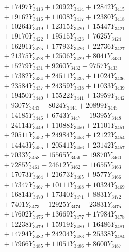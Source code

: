 \documentclass[a4paper,10pt]{article}
\begin{document}
{\begin{align}
&\;  + 17497 Y_{3413} + 12092 Y_{3414} + 12842 Y_{3415} \\[0.3ex]
&\;  + 19162 Y_{3416} + 11008 Y_{3417} + 12380 Y_{3418} \\[0.5ex]\allowbreak
&\;  + 10264 Y_{3419} + 12315 Y_{3420} + 15447 Y_{3421} \\[0.3ex]
&\;  + 19170 Y_{3422} + 19515 Y_{3423} + 7625 Y_{3424} \\[0.3ex]
&\;  + 16291 Y_{3425} + 17793 Y_{3426} + 22736 Y_{3427} \\[0.3ex]
&\;  + 21375 Y_{3428} + 12506 Y_{3429} + 8041 Y_{3430} \\[0.3ex]
&\;  + 15279 Y_{3431} + 9260 Y_{3432} + 9757 Y_{3433} \\[0.3ex]
&\;  + 17382 Y_{3434} + 24511 Y_{3435} + 11024 Y_{3436} \\[0.3ex]
&\;  + 23584 Y_{3437} + 24359 Y_{3438} + 11033 Y_{3439} \\[0.3ex]
&\;  + 19450 Y_{3440} + 15522 Y_{3441} + 13959 Y_{3442} \\[0.3ex]
&\;  + 9307 Y_{3443} + 8024 Y_{3444} + 20899 Y_{3445} \\[0.3ex]
&\;  + 14185 Y_{3446} + 6743 Y_{3447} + 19395 Y_{3448} \\[0.5ex]\allowbreak
&\;  + 24114 Y_{3449} + 11088 Y_{3450} + 21101 Y_{3451} \\[0.3ex]
&\;  + 20511 Y_{3452} + 24984 Y_{3453} + 12122 Y_{3454} \\[0.3ex]
&\;  + 14443 Y_{3455} + 20541 Y_{3456} + 23142 Y_{3457} \\[0.3ex]
&\;  + 7033 Y_{3458} + 15565 Y_{3459} + 19870 Y_{3460} \\[0.3ex]
&\;  + 7285 Y_{3461} + 24612 Y_{3462} + 11655 Y_{3463} \\[0.3ex]
&\;  + 17073 Y_{3464} + 21673 Y_{3465} + 9577 Y_{3466} \\[0.3ex]
&\;  + 17347 Y_{3467} + 10111 Y_{3468} + 10324 Y_{3469} \\[0.3ex]
&\;  + 16814 Y_{3470} + 17340 Y_{3471} + 8831 Y_{3472} \\[0.3ex]
&\;  + 7401 Y_{3473} + 12925 Y_{3474} + 23831 Y_{3475} \\[0.3ex]
&\;  + 17602 Y_{3476} + 13669 Y_{3477} + 17984 Y_{3478} \\[0.5ex]\allowbreak
&\;  + 12238 Y_{3479} + 15919 Y_{3480} + 16486 Y_{3481} \\[0.3ex]
&\;  + 14794 Y_{3482} + 24204 Y_{3483} + 25338 Y_{3484} \\[0.3ex]
&\;  + 17966 Y_{3485} + 11051 Y_{3486} + 8600 Y_{3487} \\[0.3ex]

\end{align}}
\end{document}
